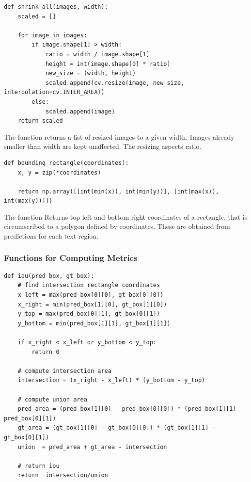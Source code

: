 \begin{lstlisting}[caption=shrink\_all]
def shrink_all(images, width):
    scaled = []
    
    for image in images:
        if image.shape[1] > width:
            ratio = width / image.shape[1]
            height = int(image.shape[0] * ratio)
            new_size = (width, height)  
            scaled.append(cv.resize(image, new_size, interpolation=cv.INTER_AREA))
        else:
            scaled.append(image)
    return scaled    
\end{lstlisting}

The function  returns a list of resized images to a given width. Images already smaller than width are kept unaffected. The resizing aspects ratio.


\begin{lstlisting}[caption=bounding\_rectangle]
def bounding_rectangle(coordinates):
    x, y = zip(*coordinates)

    return np.array([[int(min(x)), int(min(y))], [int(max(x)), int(max(y))]])
\end{lstlisting}

The function 
Returns top left and bottom right coordinates of a rectangle, that is circumscribed to a polygon defined by coordinates. These are obtained from predictions for each text region.

\subsubsection*{Functions for Computing Metrics}


\begin{lstlisting}[caption=iou]
def iou(pred_box, gt_box):
    # find intersection rectangle coordinates
    x_left = max(pred_box[0][0], gt_box[0][0])
    x_right = min(pred_box[1][0], gt_box[1][0])
    y_top = max(pred_box[0][1], gt_box[0][1])
    y_bottom = min(pred_box[1][1], gt_box[1][1])

    if x_right < x_left or y_bottom < y_top:
        return 0
    
    # compute intersection area
    intersection = (x_right - x_left) * (y_bottom - y_top)

    # compute union area
    pred_area = (pred_box[1][0] - pred_box[0][0]) * (pred_box[1][1] - pred_box[0][1]) 
    gt_area = (gt_box[1][0] - gt_box[0][0]) * (gt_box[1][1] - gt_box[0][1]) 
    union  = pred_area + gt_area - intersection

    # return iou
    return  intersection/union

\end{lstlisting}

